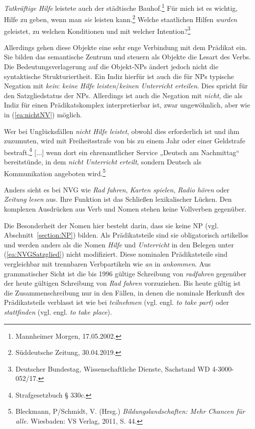 \ea \label{ea:NVGSatzglied}
\ea \label{ea:HilfeTOP} \textit{Tatkräftige Hilfe} leistete auch der städtische Bauhof.\footnote{Mannheimer Morgen, 17.05.2002.}
\ex \label{ex:HilfePron} Für mich ist es wichtig, Hilfe zu geben, wenn man \textit{sie} leisten kann.\footnote{Süddeutsche Zeitung, 30.04.2019.}
\ex \label{ex:HilfenPassiv} Welche staatlichen Hilfen \textit{wurden} geleistet, zu welchen Konditionen und mit welcher Intention?\footnote{Deutscher Bundestag, Wissenschaftliche Dienste, Sachstand WD 4-3000-052/17.}
\z 
\z 

Allerdings gehen diese Objekte eine sehr enge Verbindung mit dem Prädikat ein. Sie bilden das semantische Zentrum und steuern als Objekte die Lesart des Verbs. Die Bedeutungsverlagerung auf die Objekt-NPs ändert jedoch nicht die syntaktische Strukturiertheit. Ein Indiz hierfür ist auch die für NPs typische Negation mit \textit{kein}: \textit{keine Hilfe leisten}/\textit{keinen Unterricht erteilen}. Dies spricht für den Satzgliedstatus der NPs. Allerdings ist auch die Negation mit \textit{nicht}, die als Indiz für einen Prädikatskomplex interpretierbar ist, zwar ungewöhnlich, aber wie in (\ref{ea:nichtNV}) möglich.

\ea \label{ea:nichtNV}
\ea \label{ea:nichtHilfe} Wer bei Unglücksfällen \textit{nicht Hilfe leistet}, obwohl dies erforderlich ist und ihm zuzumuten, wird mit Freiheitsstrafe von bis zu einem Jahr oder einer Geldstrafe bestraft.\footnote{Strafgesetzbuch § 330c.}
\ex \label{ex:nichtUnterricht} [...] wenn dort ein ehrenamtlicher Service „Deutsch am Nachmittag“ bereitstünde, in dem \textit{nicht Unterricht erteilt}, sondern Deutsch als Kommunikation angeboten wird.\footnote{ Bleckmann, P/Schmidt, V. (Hrsg.) \textit{Bildungslandschaften: Mehr Chancen für alle.} Wiesbaden: VS Verlag, 2011, S. 44.}
\z 
\z 


Anders sieht es bei NVG wie \textit{Rad fahren}, \textit{Karten spielen}, \textit{Radio hören} oder \textit{Zeitung lesen} aus. Ihre Funktion ist das Schließen lexikalischer Lücken. Den komplexen Ausdrücken aus Verb und Nomen stehen keine Vollverben gegenüber. 

Die Besonderheit der Nomen hier besteht darin, dass sie keine NP (vgl. Abschnitt~\ref{section:NP}) bilden. Als Prädikatsteile sind sie obligatorisch artikellos und werden anders als die Nomen \textit{Hilfe} und \textit{Unterricht} in den Belegen unter (\ref{ea:NVGSatzglied}) nicht modifiziert. Diese nominalen Prädikatsteile sind vergleichbar mit trennbaren Verbpartikeln wie \textit{an} in \textit{ankommen}. Aus grammatischer Sicht ist die bis 1996 gültige Schreibung von \textit{radfahren} gegenüber der heute gültigen Schreibung von \textit{Rad fahren} vorzuziehen. Bis heute gültig ist die Zusammenschreibung nur in den Fällen, in denen die nominale Herkunft des Prädikatsteils verblasst ist wie bei \textit{teilnehmen} (vgl. engl. \textit{to take part}) oder \textit{stattfinden} (vgl. engl. \textit{to take place}).   


